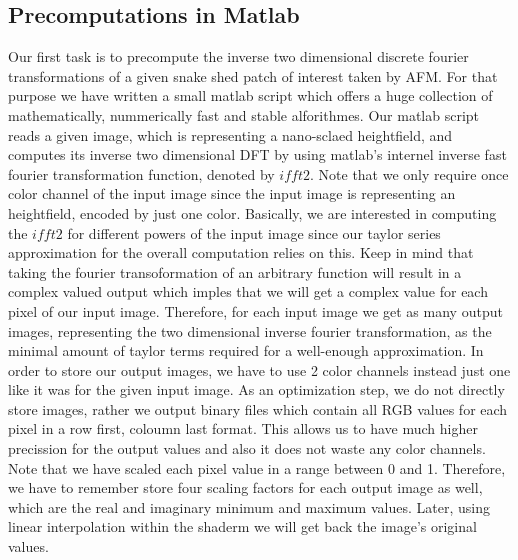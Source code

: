 \subsection{Precomputations in Matlab}
Our first task is to precompute the inverse two dimensional discrete fourier transformations of a given snake shed patch of interest taken by AFM. For that purpose we have written a small matlab script which offers a huge collection of mathematically, nummerically fast and stable alforithmes. Our matlab script reads a given image, which is representing a nano-sclaed heightfield, and computes its inverse two dimensional DFT by using matlab's internel inverse fast fourier transformation function, denoted by $ifft2$. Note that we only require once color channel of the input image since the input image is representing an heightfield, encoded by just one color. Basically, we are interested in computing the $ifft2$ for different powers of the input image since our taylor series approximation for the overall computation relies on this. Keep in mind that taking the fourier transoformation of an arbitrary function will result in a complex valued output which imples that we will get a complex value for each pixel of our input image. Therefore, for each input image we get as many output images, representing the two dimensional inverse fourier transformation, as the minimal amount of taylor terms required for a well-enough approximation. In order to store our output images, we have to use 2 color channels instead just one like it was for the given input image. As an optimization step, we do not directly store images, rather we output binary files which contain all RGB values for each pixel in a row first, coloumn last format. This allows us to have much higher precission for the output values and also it does not waste any color channels. Note that we have scaled each pixel value in a range between 0 and 1. Therefore, we have to remember store four scaling factors for each output image as well, which are the real and imaginary minimum and maximum values. Later, using linear interpolation within the shaderm we will get back the image's original values. 

